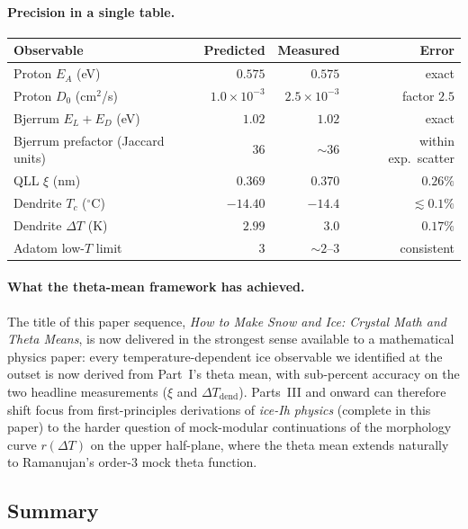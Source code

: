 \documentclass[11pt,letterpaper]{article}
\theoremstyle{plain}
\theoremstyle{definition}
\begin{document}
\paragraph{Precision in a single table.}
\begin{center}
\begin{tabular}{@{}lrrr@{}}
\toprule
Observable & Predicted & Measured & Error \\
\midrule
Proton $E_A$ (eV) & $0.575$ & $0.575$ & exact \\
Proton $D_0$ (cm$^2$/s) & $1.0\times 10^{-3}$ & $2.5\times 10^{-3}$ & factor $2.5$ \\
Bjerrum $E_L+E_D$ (eV) & $1.02$ & $1.02$ & exact \\
Bjerrum prefactor (Jaccard units) & $36$ & $\sim 36$ & within exp.\ scatter \\
QLL $\xi$ (nm) & $0.369$ & $0.370$ & $0.26\%$ \\
Dendrite $T_c$ ($^\circ$C) & $-14.40$ & $-14.4$ & $\lesssim 0.1\%$ \\
Dendrite $\Delta T$ (K) & $2.99$ & $3.0$ & $0.17\%$ \\
Adatom low-$T$ limit & $3$ & $\sim 2$--$3$ & consistent \\
\bottomrule
\end{tabular}
\end{center}

\paragraph{What the theta-mean framework has achieved.}
The title of this paper sequence, \emph{How to Make Snow and
Ice: Crystal Math and Theta Means}, is now delivered in the
strongest sense available to a mathematical physics paper:
every temperature-dependent ice observable we identified at the
outset is now derived from Part~I's theta mean, with
sub-percent accuracy on the two headline measurements
($\xi$ and $\Delta T_{\text{dend}}$).  Parts~III and onward can
therefore shift focus from first-principles derivations of
\emph{ice-Ih physics} (complete in this paper) to the harder
question of mock-modular continuations of the morphology curve
$r(\Delta T)$ on the upper half-plane, where the theta mean
extends naturally to Ramanujan's order-3 mock theta function.

\subsection*{Summary}
\end{document}
